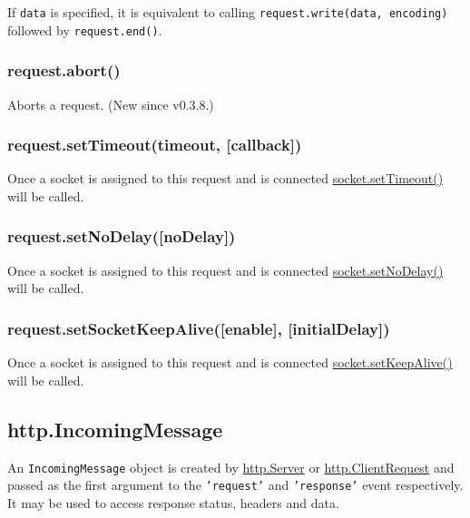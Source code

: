 If \texttt{data} is specified, it is equivalent to calling
\texttt{request.write(data, encoding)} followed by
\texttt{request.end()}.

\subsubsection{request.abort()}\label{request.abort}

Aborts a request. (New since v0.3.8.)

\subsubsection{request.setTimeout(timeout,
{[}callback{]})}\label{request.settimeouttimeout-callback}

Once a socket is assigned to this request and is connected
\href{net.html\#net_socket_settimeout_timeout_callback}{socket.setTimeout()}
will be called.

\subsubsection{request.setNoDelay({[}noDelay{]})}\label{request.setnodelaynodelay}

Once a socket is assigned to this request and is connected
\href{net.html\#net_socket_setnodelay_nodelay}{socket.setNoDelay()} will
be called.

\subsubsection{request.setSocketKeepAlive({[}enable{]},
{[}initialDelay{]})}\label{request.setsocketkeepaliveenable-initialdelay}

Once a socket is assigned to this request and is connected
\href{net.html\#net_socket_setkeepalive_enable_initialdelay}{socket.setKeepAlive()}
will be called.

\subsection{http.IncomingMessage}\label{http.incomingmessage}

An \texttt{IncomingMessage} object is created by
\hyperref[httpux5fclassux5fhttpux5fserver]{http.Server} or
\hyperref[httpux5fclassux5fhttpux5fclientrequest]{http.ClientRequest}
and passed as the first argument to the \texttt{'request'} and
\texttt{'response'} event respectively. It may be used to access
response status, headers and data.

